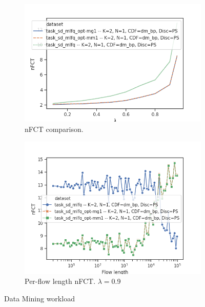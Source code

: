 \begin{figure}
	\centering
	\begin{subfigure}{.5\textwidth}
		\centering
		\includegraphics[width=1.05\textwidth]{Chapter3/Figures/dm_ps_comparison.png}
		\caption{nFCT comparison.}
		\label{fig:optlbgain-dm}
	\end{subfigure}%
	\begin{subfigure}{.5\textwidth}
		\centering
		\includegraphics[width=\textwidth]{Chapter3/Figures/dm_ps_detailed.png}
		\caption{Per-flow length nFCT. $\lambda=$0.9}
		\label{fig:optlbgainvsflowsize-dm}
	\end{subfigure}%
	\caption{Data Mining workload}
	\label{fig:optlb-dm}
\end{figure}%
